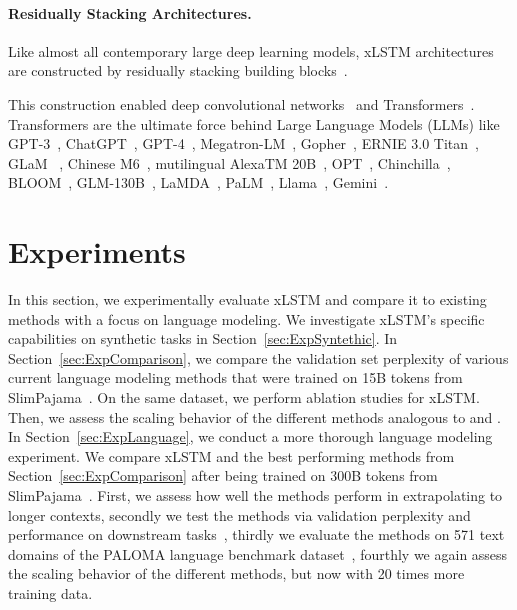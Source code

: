 \paragraph{Residually Stacking Architectures.} Like almost all contemporary large deep learning models, xLSTM architectures are constructed by residually stacking building blocks~\citep{Srivastava:15,He:16}.

This construction enabled deep convolutional networks~\citep{He:16} and Transformers~\citep{Vaswani:17}. Transformers are the ultimate force behind Large Language Models (LLMs) like GPT-3~\citep{Brown:20short}, ChatGPT~\citep{Schulman:22short}, GPT-4~\citep{Achiam:23gpt4short}, Megatron-LM~\citep{Shoeybi:19}, Gopher~\citep{Rae:21short}, ERNIE 3.0 Titan~\citep{Wang:21arxivshort}, GLaM ~\citep{Du:21glamshort}, Chinese M6~\citep{Lin:21}, mutilingual AlexaTM 20B~\citep{Soltan:22}, OPT~\citep{Zhang:22opt}, Chinchilla~\citep{Hoffmann:22short}, BLOOM~\citep{Scao:22arxivshort}, GLM-130B~\citep{Zeng:22arxivshort}, LaMDA~\citep{Thoppilan:22short}, PaLM~\citep{Chowdhery:22short}, Llama~\citep{Touvron:23arxiv}, Gemini~\citep{GeminiTeam:23arxiv,Reid:24arxiv}.

\section{Experiments}
\label{sec:Exp}

In this section, we experimentally evaluate xLSTM and compare it to existing methods with a focus on language modeling. We investigate xLSTM's specific capabilities on synthetic tasks in Section~\ref{sec:ExpSyntethic}. 
In Section~\ref{sec:ExpComparison}, we compare the validation set perplexity of various current language modeling methods that were trained on 15B tokens from SlimPajama~\citep{Soboleva:23}. On the same dataset, we perform ablation studies for xLSTM. Then, we assess the scaling behavior of the different methods analogous to \citet{Kaplan:20} and \citet{Brown:20short}.
In Section~\ref{sec:ExpLanguage}, 
we conduct a more thorough language modeling experiment. We compare xLSTM and the best performing methods from Section~\ref{sec:ExpComparison} after being trained on 300B tokens from SlimPajama~\citep{Soboleva:23}. First, we assess how well the methods perform in extrapolating to longer contexts, secondly we test the methods via validation perplexity and performance on downstream tasks~\citep{Sutawika:24}, thirdly we evaluate the methods on 571 text domains of the PALOMA language benchmark dataset~\citep{Magnusson:23arxivshort}, fourthly we again assess the scaling behavior of the different methods, but now with 20 times more training data.

